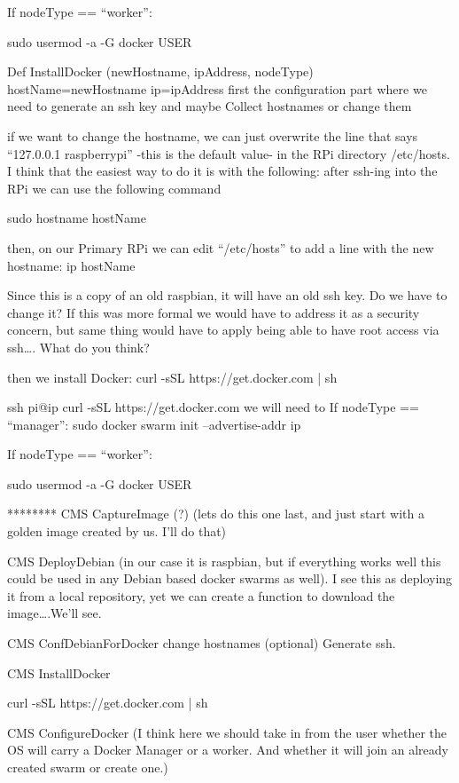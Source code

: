 \documentclass[sigconf]{acmart}
\begin{document}
	If nodeType == “worker”:
	
	sudo usermod -a -G docker USER
	
	
	Def InstallDocker (newHostname, ipAddress, nodeType)
	hostName=newHostname
	ip=ipAddress
	first the configuration part where we need to generate an ssh key and maybe Collect hostnames or change them
	
	if we want to change the hostname, we can just overwrite the line that says “127.0.0.1 raspberrypi” -this is the default value- in the RPi directory /etc/hosts. I think that the easiest way to do it is with the following:
	after ssh-ing into the RPi we can use the following command
	
	sudo hostname hostName
	
	then, on our Primary RPi we can edit “/etc/hosts” to add a line with the new hostname:
	ip hostName
	
	Since this is a copy of an old raspbian, it will have an old ssh key. Do we have to change it? If this was more formal we would have to address it as a security concern, but same thing would have to apply being able to have root access via ssh…. What do you think?
	
	then we install Docker: curl -sSL https://get.docker.com | sh
	
	ssh pi@ip curl -sSL https://get.docker.com
	we will need to
	If nodeType == “manager”:
	sudo docker swarm init --advertise-addr ip
	
	If nodeType == “worker”:
	
	sudo usermod -a -G docker USER
	
	********
	CMS CaptureImage (?) (lets do this one last, and just start with a golden image created by us. I’ll do that)
	
	CMS DeployDebian (in our case it is raspbian, but if everything works well this could be used in any Debian based docker swarms as well). I see this as deploying it from a local repository, yet we can create a function to download the image….We’ll see.
	
	CMS ConfDebianForDocker change hostnames (optional) Generate ssh.
	
	CMS InstallDocker
	
	curl -sSL https://get.docker.com | sh
	
	
	CMS ConfigureDocker (I think here we should take in from the user whether the OS will carry a Docker Manager or a worker. And whether it will join an already created swarm or create one.)
	
	
	
\end{document}
